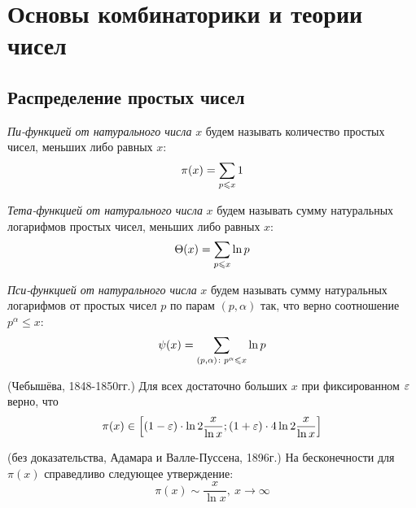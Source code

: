\section{Основы комбинаторики и теории чисел}

\subsection{Распределение простых чисел}

\begin{definition}
	\textit{Пи-функцией от натурального числа } $x$ будем называть количество простых чисел, меньших либо равных $x$:
	\[
		\pi(x) = \sum\limits_{p \leqslant x} 1
	\]
\end{definition}

\begin{definition}
	\textit{Тета-функцией от натурального числа} $x$ будем называть сумму натуральных логарифмов простых чисел, меньших либо равных $x$:
	\[
		\Theta(x) = \sum\limits_{p \leqslant x} \ln p
	\]
\end{definition}

\begin{definition}
	\textit{Пси-функцией от натурального числа} $x$ будем называть сумму натуральных логарифмов от простых чисел $p$ по парам $(p, \alpha)$ так, что верно соотношение $p^\alpha \le x$:
	\[
		\psi(x) = \sum\limits_{(p, \alpha) \colon p^\alpha \leqslant x} \ln p
	\]
\end{definition}

\begin{theorem} (Чебышёва, 1848-1850гг.)
	Для всех достаточно больших $x$ при фиксированном $\varepsilon$ верно, что
	\[
		\pi(x) \in \left[(1 - \varepsilon) \cdot \ln 2 \frac{x}{\ln x}; (1 + \varepsilon) \cdot 4\ln 2 \frac{x}{\ln x}\right]
	\]
\end{theorem}

\begin{theorem} (без доказательства, Адамара и Валле-Пуссена, 1896г.)
	На бесконечности для $\pi(x)$ справедливо следующее утверждение:
	\[
		\pi(x) \sim \frac{x}{\ln x},\ x \to \infty
	\]
\end{theorem}


